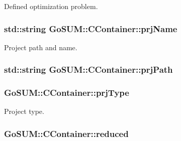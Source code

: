 Defined optimization problem. 

\hypertarget{class_go_s_u_m_1_1_c_container_a14823f77454a7bcbba182c30f6ae0735}{
\subsubsection[{prj\-Name}]{\setlength{\rightskip}{0pt plus 5cm}std\-::string Go\-S\-U\-M\-::\-C\-Container\-::prj\-Name\hspace{0.3cm}{\ttfamily [private]}}}\label{class_go_s_u_m_1_1_c_container_a14823f77454a7bcbba182c30f6ae0735}


Project path and name. 

\hypertarget{class_go_s_u_m_1_1_c_container_a6aa9dc492a21cf8966df5d90817c93b6}{
\subsubsection[{prj\-Path}]{\setlength{\rightskip}{0pt plus 5cm}std\-::string Go\-S\-U\-M\-::\-C\-Container\-::prj\-Path\hspace{0.3cm}{\ttfamily [private]}}}\label{class_go_s_u_m_1_1_c_container_a6aa9dc492a21cf8966df5d90817c93b6}
\hypertarget{class_go_s_u_m_1_1_c_container_a35c156d40a3deb898fec8b4fe0d7639a}{
\subsubsection[{prj\-Type}]{ Go\-S\-U\-M\-::\-C\-Container\-::prj\-Type\hspace{0.3cm}{\ttfamily [private]}}}\label{class_go_s_u_m_1_1_c_container_a35c156d40a3deb898fec8b4fe0d7639a}


Project type. 

\hypertarget{class_go_s_u_m_1_1_c_container_a6df9da86ba89c203d7a4b8aacaabf45c}{
\subsubsection[{reduced}]{ Go\-S\-U\-M\-::\-C\-Container\-::reduced\hspace{0.3cm}{\ttfamily [private]}}}\label{class_go_s_u_m_1_1_c_container_a6df9da86ba89c203d7a4b8aacaabf45c}


